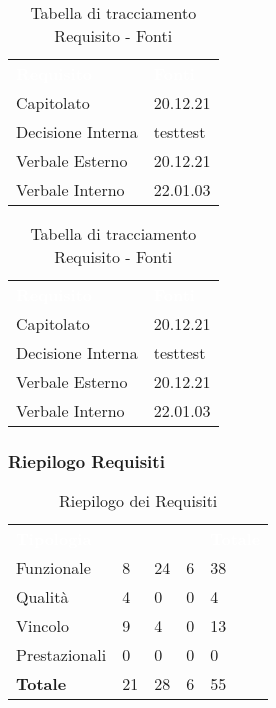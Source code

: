\begin{table}[!htbp]
\renewcommand{\arraystretch}{1.5}
\begin{tabular}{ m{}<{\centering}  m{}<{\centering} }
	\rowcolor{darkblue}
	\textcolor{white}{\textbf{Requisito}} &\textcolor{white}{\textbf{Fonti}}\\ 

	Capitolato & 20.12.21\\	

	Decisione Interna & testtest \\
	
	Verbale Esterno & 20.12.21\\
	
	Verbale Interno & 22.01.03 \\

\end{tabular}
\begin{tabular}{ m{}<{\centering}  m{}<{\centering} }
	\rowcolor{darkblue}
	\textcolor{white}{\textbf{Requisito}} &\textcolor{white}{\textbf{Fonti}}\\ 

	Capitolato & 20.12.21\\	

	Decisione Interna & testtest \\
	
	Verbale Esterno & 20.12.21\\
	
	Verbale Interno & 22.01.03 \\

\end{tabular}
\caption{Tabella di tracciamento Requisito - Fonti}
\end{table}

\subsubsection{Riepilogo Requisiti}

\begin{table}[!htbp]
\renewcommand{\arraystretch}{1.5}
\begin{tabular}{ m{}<{\centering}  m{}<{\centering}  m{}<{\centering}  m{}<{\centering}  m{}<{\centering} }
	\rowcolor{darkblue}
	\textcolor{white}{\textbf{Tipologia}} &\textcolor{white}{\textbf{\Ob}}& \textcolor{white}{\textbf{\De}} & \textcolor{white}{\textbf{\Fa}}&\textcolor{white}{\textbf{Totale}}\\ 
	Funzionale & 8 & 24 & 6 & 38\\	
	Qualità & 4 & 0 & 0 & 4 \\	
	Vincolo & 9 & 4 & 0 & 13 \\	
	Prestazionali & 0 & 0 & 0 & 0\\
	\textbf{Totale} & 21 & 	28 & 6 & 55
\end{tabular}
\caption{Riepilogo dei Requisiti}
\end{table}